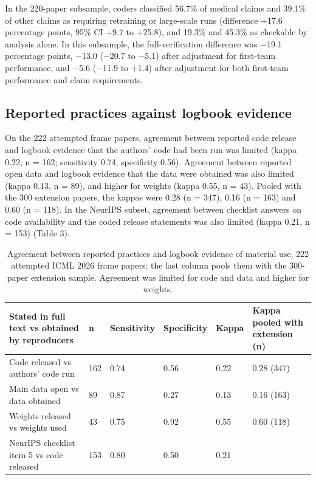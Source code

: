 \documentclass[11pt]{article}
\begin{document}
In the 220-paper subsample, coders classified 56.7\% of medical claims and 39.1\% of other claims as requiring retraining or large-scale runs (difference +17.6 percentage points, 95\% CI +9.7 to +25.8), and 19.3\% and 45.3\% as checkable by analysis alone. In this subsample, the full-verification difference was −19.1 percentage points, −13.0 (−20.7 to −5.1) after adjustment for first-team performance, and −5.6 (−11.9 to +1.4) after adjustment for both first-team performance and claim requirements.

\subsection*{Reported practices against logbook evidence}
On the 222 attempted frame papers, agreement between reported code release and logbook evidence that the authors' code had been run was limited (kappa 0.22; n = 162; sensitivity 0.74, specificity 0.56). Agreement between reported open data and logbook evidence that the data were obtained was also limited (kappa 0.13, n = 89), and higher for weights (kappa 0.55, n = 43). Pooled with the 300 extension papers, the kappas were 0.28 (n = 347), 0.16 (n = 163) and 0.60 (n = 118). In the NeurIPS subset, agreement between checklist answers on code availability and the coded release statements was also limited (kappa 0.21, n = 153) (Table 3).

\begin{table}[htbp]
\centering\footnotesize
\renewcommand{\thetable}{3}
\caption{Agreement between reported practices and logbook evidence of material use, 222 attempted ICML 2026 frame papers; the last column pools them with the 300-paper extension sample. Agreement was limited for code and data and higher for weights.}\label{tab:table3}
\begin{tabularx}{\textwidth}{XL{0.7cm}L{1.6cm}L{1.6cm}L{1.0cm}L{2.4cm}}
\toprule
\textbf{Stated in full text vs obtained by reproducers} & \textbf{n} & \textbf{Sensitivity} & \textbf{Specificity} & \textbf{Kappa} & \textbf{Kappa pooled with extension (n)} \\ \midrule
Code released vs authors' code run & 162 & 0.74 & 0.56 & 0.22 & 0.28 (347) \\
Main data open vs data obtained & 89 & 0.87 & 0.27 & 0.13 & 0.16 (163) \\
Weights released vs weights used & 43 & 0.75 & 0.92 & 0.55 & 0.60 (118) \\
NeurIPS checklist item 5 vs code released & 153 & 0.80 & 0.50 & 0.21 &  \\
\bottomrule
\end{tabularx}
\end{table}
\end{document}

